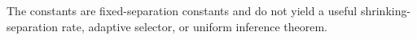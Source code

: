 The constants are fixed-separation constants and do not yield a useful shrinking-separation rate, adaptive selector, or uniform inference theorem.